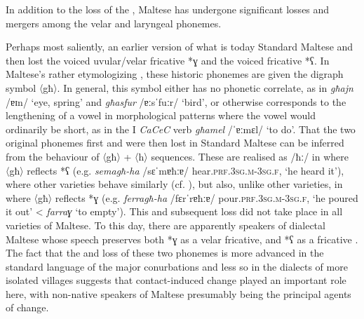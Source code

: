 \documentclass[output=paper]{langsci/langscibook}
\begin{document}
In addition to the loss of the , Maltese has undergone significant losses and mergers among the velar and laryngeal phonemes.

Perhaps most saliently, an earlier version of what is today  Standard Maltese  and then lost the voiced uvular/velar fricative *ɣ and the voiced  fricative *ʕ. In Maltese's rather etymologizing , these historic phonemes are given the digraph symbol 〈għ〉. In general, this symbol either has no phonetic correlate, as in \textit{għajn} /ɐɪn/ `eye, spring' and \textit{għasfur} /ɐːsˈfuːr/ `bird', or otherwise corresponds to the lengthening of a vowel in morphological patterns where the vowel would ordinarily be short, as in the  I \textit{CaCeC} verb \textit{għamel} /ˈɐːmɛl/ `to do'. That the two original phonemes first  and were then lost in  Standard Maltese can be inferred from the behaviour of 〈għ〉 + 〈h〉 sequences. These are realised as /ħː/ in  where 〈għ〉 reflects *ʕ (e.g. \textit{semagħ-ha} /sɛˈmɐħːɐ/ hear.\textsc{prf.3sg.m-3sg.f}, `he heard it'), where other  varieties behave similarly (cf. \citealt[18] {Woidich2006}), but also, unlike other  varieties, in  where 〈għ〉 reflects *ɣ (e.g. \textit{ferragħ-ha} /fɛrˈrɐħːɐ/ pour.\textsc{prf.3sg.m-3sg.f}, `he poured it out' <  \textit{farraɣ} `to empty'). This  and subsequent loss did not take place in all varieties of Maltese. To this day, there are apparently speakers of dialectal Maltese whose speech preserves both *ɣ as a velar fricative, and *ʕ as a  fricative \citep{klimiuk2017}. The fact that the  and loss of these two phonemes is more advanced in the standard language of the major conurbations and less so in the dialects of more isolated villages suggests that contact-induced change played an important role here, with non-native speakers of Maltese presumably being the principal agents of change.
\end{document}
